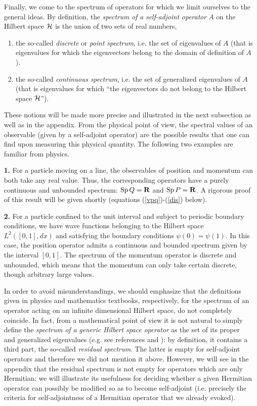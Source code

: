 \documentclass[a4wide,12pt]{report}
\begin{document}
Finally, we come to the spectrum of operators
for which we limit ourselves to the general ideas. 
By definition, the {\em spectrum of a self-adjoint operator} 
$A$ on the Hilbert space ${\cal H}$ 
is the union of two sets of real numbers, 
\begin{enumerate}
\item
the so-called {\em discrete} or {\em point spectrum},
i.e. the set of eigenvalues of $A$
(that is eigenvalues for which 
the eigenvectors belong to the domain of definition 
of $A$).
\item
the so-called {\em continuous spectrum},
i.e. the set of generalized eigenvalues of $A$ (that is 
eigenvalues for which ``the eigenvectors do not belong to 
the Hilbert space ${\cal H}$'').
\end{enumerate}
These notions will be made more precise 
and illustrated in the next subsection as well as in the appendix. 
From the physical point of view, the spectral values of an  
observable (given by a self-adjoint operator)  
are the possible results
that one can find upon measuring this physical quantity. 
The following two examples are familiar from physics. 


\medskip 

\noindent
{\bf 1.}
For a particle moving on a line, the observables of position and
momentum can both take any real value. Thus, the corresponding 
operators have a purely continuous and unbounded spectrum:
${\rm Sp} \, Q = {\bf R}$ and ${\rm Sp} \, P = {\bf R}$. 
A rigorous proof of this result will be given shortly
(equations (\ref{vpq})-(\ref{dis}) below).

\medskip 

\noindent
{\bf 2.}
For a particle confined to the unit interval and subject to 
periodic boundary conditions, we have 
wave functions belonging to the Hilbert space 
$L^2 ( [0,1],dx)$ 
and satisfying the boundary conditions 
$\psi (0) = \psi (1)$. 
In this case, the position operator 
admits a continuous and bounded spectrum given by the interval  
$[0,1]$. The spectrum of the momentum operator 
is discrete and unbounded, 
which means that the momentum can only take certain discrete, though 
arbitrary large values. 

\medskip 

In order to avoid misunderstandings, we should emphasize that the
definitions given in physics and mathematics 
textbooks, respectively, for the spectrum of an operator acting on 
an infinite dimensional Hilbert space, do not completely coincide.
In fact, from a mathematical point of view it is not  
natural to simply define 
the {\em spectrum of a generic Hilbert space operator} as 
the set of its proper and generalized eigenvalues (e.g. see 
references \cite{jau} and \cite{sg}):
by definition, it contains a third part, the so-called 
{\em residual spectrum}. The latter 
is empty for self-adjoint operators  
and therefore we did not mention it above. 
However, we will see in the appendix that 
the residual spectrum is not empty 
for operators which are only Hermitian; 
we will illustrate its usefulness for 
deciding whether a given 
Hermitian operator can possibly be modified so as to become 
self-adjoint
(i.e. precisely the criteria for self-adjointness 
of a Hermitian operator that we  
already evoked). 
\end{document}
